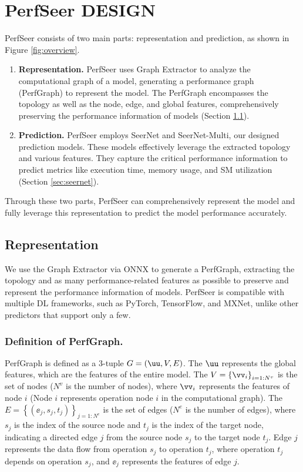 \section{PerfSeer DESIGN}
PerfSeer consists of two main parts: representation and prediction, as shown in Figure \ref{fig:overview}.
\begin{enumerate}
\item
\textbf{Representation.} PerfSeer uses Graph Extractor to analyze the computational graph of a model, generating a performance graph (PerfGraph) to represent the model. The PerfGraph encompasses the topology as well as the node, edge, and global features, comprehensively preserving the performance information of models 
(Section \ref{sec:graph extractor}).

\item
\textbf{Prediction.} PerfSeer employs SeerNet and SeerNet-Multi, our designed prediction models. These models effectively leverage the extracted topology and various features. They capture the critical performance information to predict metrics like execution time, memory usage, and SM utilization (Section \ref{sec:seernet}).
\end{enumerate}

Through these two parts, PerfSeer can comprehensively represent the model and fully leverage this representation to predict the model performance accurately.

\subsection{Representation}\label{sec:graph extractor}
We use the Graph Extractor via ONNX to generate a PerfGraph, extracting the topology and as many performance-related features as possible to preserve and represent the performance information of models. 
PerfSeer is compatible with multiple DL frameworks, such as PyTorch, TensorFlow, and MXNet, unlike other predictors that support only a few.
\subsubsection{Definition of PerfGraph.}\label{sec:definition of graph}
PerfGraph is defined as a 3-tuple $G = \left(\uu, V, E\right)$.
The $\uu$ represents the global features, which are the features of the entire model.
The $V = \left\{\vv_i\right\}_{i=1:N^v}$ is the set of nodes ($N^v$ is the number of nodes), where $\vv_i$ represents the features of node $i$ (Node $i$ represents operation node $i$ in the computational graph).
The $E = \left\{\left(\ee_j, s_j, t_j\right)\right\}_{j=1:N^e}$ is the set of edges ($N^e$ is the number of edges), where $s_j$ is the index of the source node and $t_j$ is the index of the target node, indicating a directed edge $j$ from the source node $s_j$ to the target node $t_j$. 
Edge $j$ represents the data flow from operation $s_j$ to operation $t_j$, where operation $t_j$ depends on operation $s_j$, and \(\ee_j\) represents the features of edge $j$.

